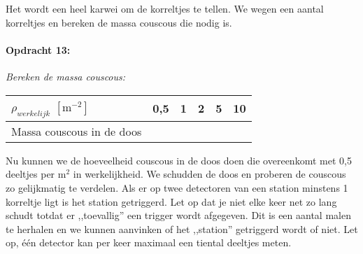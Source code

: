 \bigskip{}
Het wordt een heel karwei om de korreltjes te tellen. We wegen een
aantal korreltjes en bereken de massa couscous die nodig is.

\begin{minipage}[t]{1\columnwidth}%

\paragraph{Opdracht 13:}

\textit{Bereken de massa couscous:}

\bigskip{}

\begin{tabular}{|x{.3\textwidth}|x{.1\textwidth}|x{.1\textwidth}
                |x{.1\textwidth}|x{.1\textwidth}|x{.1\textwidth}|}
    \hline 
    $\rho_{werkelijk}$ $\left[\mathrm{m^{-2}}\right]$ & 0,5 & 1 & 2 & 5 & 10 \\
    \hline 
    Massa couscous in de doos &  &  &  &  & \\
    \hline 
\end{tabular}
\end{minipage}

\bigskip{}


Nu kunnen we de hoeveelheid couscous in de doos doen die overeenkomt met
0,5 deeltjes per $\mathrm{m^{2}}$ in werkelijkheid. We schudden de doos
en proberen de couscous zo gelijkmatig te verdelen. Als er op twee
detectoren van een station minstens 1 korreltje ligt is het station
getriggerd. Let op dat je niet elke keer net zo lang schudt totdat er ,,toevallig''
een trigger wordt afgegeven. Dit is een aantal malen te herhalen en we
kunnen aanvinken of het ,,station'' getriggerd wordt of niet. Let op,
één detector kan per keer maximaal een tiental deeltjes meten.

